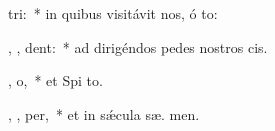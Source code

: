 \item {}    tri:~* in quibus visitávit nos, ó  to:
\item {} ,   ,     dent:~* ad dirigéndos pedes nostros   cis.
\item {} ,  o,~* et Spi to.
\item {}   ,  ,  per,~* et in sǽcula sæ. men.
